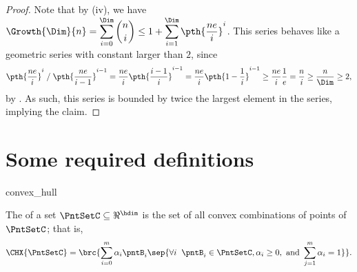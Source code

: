    

\begin{proof}
    Note that by  (iv), we have
    $\displaystyle \Growth{\Dim}{n} = \sum_{i=0}^{\Dim} \binom{n}{i}
    \leq 1 + \sum_{i=1}^{\Dim} \pth{\frac{ne}{i}}^i$.
    This series behaves like a geometric series with constant larger
    than $2$, since
    \begin{equation*}
        {\pth{\frac{ne}{i}}^i} \;/ \; {\pth{\frac{ne}{i-1}}^{i-1}} =
        \frac{ne }{i} \pth{\frac{i-1}{i}}^{i-1} = \frac{ne }{i} \pth{1 -
           \frac{1}{i}}^{i-1} \geq \frac{ne }{i} \frac{1}{e} = \frac{n}{i}
        \geq \frac{n}{\Dim} \geq 2,        
    \end{equation*}
    by . As such, this series is bounded by
    twice the largest element in the series, implying the claim.
\end{proof}




\section{Some required definitions}
\begin{fragment}{convex_hull}
    \begin{defn}
        The  of a set $\PntSetC \subseteq
        \Re^\hdim$ is the set of all convex combinations of points of
        $\PntSetC$; that is,
        \[
        \CHX{ \PntSetC} = \brc{\sum_{i=0}^m \alpha_i \pntB_i\sep{
              \forall i \;\;\pntB_i \in \PntSetC, \alpha_i \geq 0,
              \text{ and } \sum_{j=1}^m \alpha_i =1}}.
        \]
    \end{defn}
\end{fragment}




   

\StandAloneMode{
   
%
}



\ChapterEnd{}

% 
  
